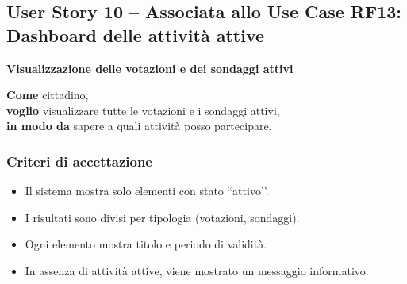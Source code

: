 \documentclass{article}
\begin{document}

\subsection{User Story 10 -- Associata allo Use Case RF13: Dashboard delle attività attive}

\textbf{Visualizzazione delle votazioni e dei sondaggi attivi}

\textbf{Come} cittadino,\\
\textbf{voglio} visualizzare tutte le votazioni e i sondaggi attivi,\\
\textbf{in modo da} sapere a quali attività posso partecipare.

\subsubsection{Criteri di accettazione}
\begin{itemize}
    \item Il sistema mostra solo elementi con stato ``attivo’’.
    \item I risultati sono divisi per tipologia (votazioni, sondaggi).
    \item Ogni elemento mostra titolo e periodo di validità.
    \item In assenza di attività attive, viene mostrato un messaggio informativo.
\end{itemize}
\end{document}
